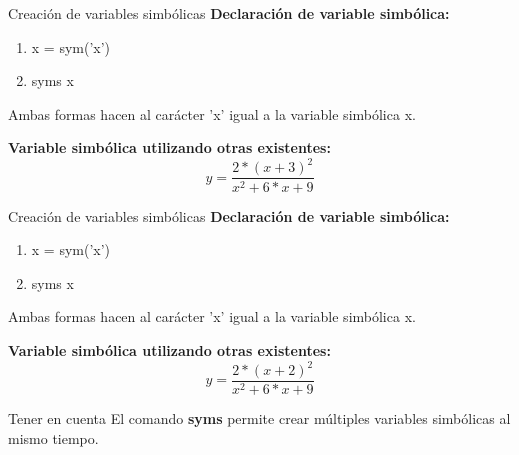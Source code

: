 \documentclass{bredelebeamer}
\begin{document}
\begin{frame}{Creación de variables simbólicas}
\textbf{Declaración de variable simbólica:}
\begin{enumerate}
\item x = sym('x')
\item syms x
\end{enumerate}
\begin{center}
Ambas formas hacen al carácter 'x' igual a la variable simbólica x.
\end{center}
\textbf{Variable simbólica utilizando otras existentes:}
\begin{equation*}
y = \frac{2*(x+3)^2}{x^2+6*x+9}
\end{equation*}
\end{frame}

\begin{frame}{Creación de variables simbólicas}
\textbf{Declaración de variable simbólica:}
\begin{enumerate}
\item x = sym('x')
\item syms x
\end{enumerate}
\begin{center}
Ambas formas hacen al carácter 'x' igual a la variable simbólica x.
\end{center}
\textbf{Variable simbólica utilizando otras existentes:}
\begin{equation*}
y = \frac{2*(x+2)^2}{x^2+6*x+9}
\end{equation*}
\begin{block}{Tener en cuenta}
El comando \textbf{syms} permite crear múltiples variables simbólicas al mismo tiempo.
\end{block}
\end{frame}
\end{document}
